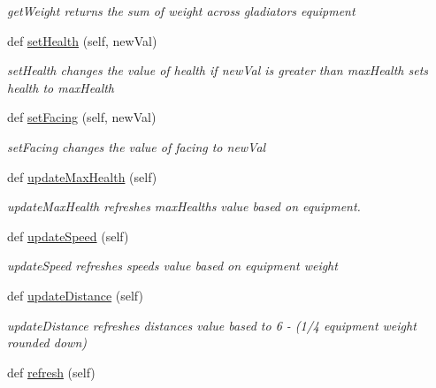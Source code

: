 \begin{DoxyCompactItemize}
\begin{DoxyCompactList}\small\item\em get\+Weight returns the sum of weight across gladiator\textquotesingle{}s equipment \end{DoxyCompactList}\item 
def \hyperlink{classGladiator_1_1Gladiator_a33156345f20bcdf2f45dfc05a3a38989}{set\+Health} (self, new\+Val)
\begin{DoxyCompactList}\small\item\em set\+Health changes the value of health if new\+Val is greater than max\+Health sets health to max\+Health \end{DoxyCompactList}\item 
def \hyperlink{classGladiator_1_1Gladiator_a71e06df9f51ca6be12a3b636a052c78b}{set\+Facing} (self, new\+Val)
\begin{DoxyCompactList}\small\item\em set\+Facing changes the value of facing to new\+Val \end{DoxyCompactList}\item 
def \hyperlink{classGladiator_1_1Gladiator_ab476e81b99b93685b6e4f8e9c1915c1a}{update\+Max\+Health} (self)
\begin{DoxyCompactList}\small\item\em update\+Max\+Health refreshes max\+Health\textquotesingle{}s value based on equipment. \end{DoxyCompactList}\item 
\hypertarget{classGladiator_1_1Gladiator_aea19fb60c64c3f8b85f70df434ee11d7}{}def \hyperlink{classGladiator_1_1Gladiator_aea19fb60c64c3f8b85f70df434ee11d7}{update\+Speed} (self)\label{classGladiator_1_1Gladiator_aea19fb60c64c3f8b85f70df434ee11d7}

\begin{DoxyCompactList}\small\item\em update\+Speed refreshes speed\textquotesingle{}s value based on equipment weight \end{DoxyCompactList}\item 
\hypertarget{classGladiator_1_1Gladiator_a1e11a31089e0a4f05d2c05e5dc461e17}{}def \hyperlink{classGladiator_1_1Gladiator_a1e11a31089e0a4f05d2c05e5dc461e17}{update\+Distance} (self)\label{classGladiator_1_1Gladiator_a1e11a31089e0a4f05d2c05e5dc461e17}

\begin{DoxyCompactList}\small\item\em update\+Distance refreshes distance\textquotesingle{}s value based to 6 -\/ (1/4 equipment weight rounded down) \end{DoxyCompactList}\item 
\hypertarget{classGladiator_1_1Gladiator_af0f5f1318d375490b8630a9f25039f50}{}def \hyperlink{classGladiator_1_1Gladiator_af0f5f1318d375490b8630a9f25039f50}{refresh} (self)\label{classGladiator_1_1Gladiator_af0f5f1318d375490b8630a9f25039f50}


\end{DoxyCompactItemize}
